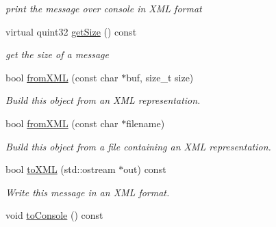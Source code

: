 \begin{DoxyCompactItemize}
\begin{DoxyCompactList}\small\item\em print the message over console in X\+ML format \end{DoxyCompactList}\item 
virtual quint32 \hyperlink{classSPATEMMessage_a96963a892572398a79ea2c742d53085b}{get\+Size} () const 
\begin{DoxyCompactList}\small\item\em get the size of a message \end{DoxyCompactList}\item 
bool \hyperlink{classSPATEMMessage_a22a5b83422f56e47cd67cdb92309f14b}{from\+X\+ML} (const char $\ast$buf, size\+\_\+t size)
\begin{DoxyCompactList}\small\item\em Build this object from an X\+ML representation. \end{DoxyCompactList}\item 
bool \hyperlink{classSPATEMMessage_af892fdbc96a9ca40ea391fe6e3a54737}{from\+X\+ML} (const char $\ast$filename)
\begin{DoxyCompactList}\small\item\em Build this object from a file containing an X\+ML representation. \end{DoxyCompactList}\item 
bool \hyperlink{classSPATEMMessage_ae52cf83efa24c7ce678f002e96bfff60}{to\+X\+ML} (std\+::ostream $\ast$out) const 
\begin{DoxyCompactList}\small\item\em Write this message in an X\+ML format. \end{DoxyCompactList}\item 
void \hyperlink{classSPATEMMessage_a36055a9e9d460fad039b7b1dbae7b12e}{to\+Console} () const \hypertarget{classSPATEMMessage_a36055a9e9d460fad039b7b1dbae7b12e}{}\label{classSPATEMMessage_a36055a9e9d460fad039b7b1dbae7b12e}


\end{DoxyCompactItemize}
